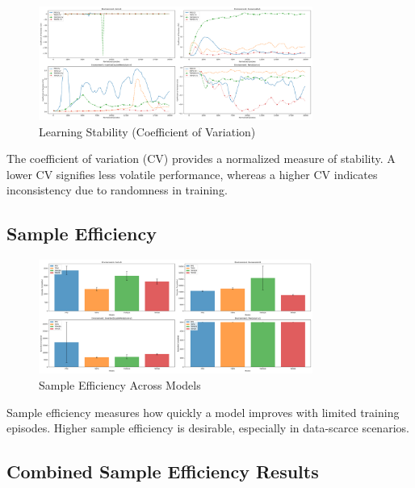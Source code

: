 \documentclass{article}
\begin{document}
\begin{figure}[H]
    \centering
    \includegraphics[width=0.8\textwidth]{.assets/learning_stability_cv.png}
    \caption{Learning Stability (Coefficient of Variation)}
\end{figure}

The coefficient of variation (CV) provides a normalized measure of stability. A lower CV signifies less volatile performance, whereas a higher CV indicates inconsistency due to randomness in training.

\subsection*{Sample Efficiency}

\begin{figure}[H]
    \centering
    \includegraphics[width=0.8\textwidth]{.assets/sample_efficiency.png}
    \caption{Sample Efficiency Across Models}
\end{figure}

Sample efficiency measures how quickly a model improves with limited training episodes. Higher sample efficiency is desirable, especially in data-scarce scenarios.

\subsection*{Combined Sample Efficiency Results}
\end{document}

